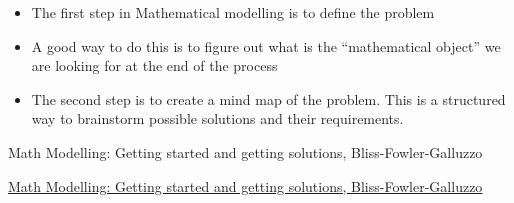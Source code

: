 \begin{lesson}

	\begin{itemize}
		\item The first step in Mathematical modelling is to define the problem
		\item A good way to do this is to figure out what is the ``mathematical object'' we are looking for at the end of the process

		\item The second step is to create a mind map of the problem. This is a structured way to brainstorm possible solutions and their requirements.
	\end{itemize}
	

\begin{annotation}
	\begin{goals}
	Math Modelling: Getting started and getting solutions, Bliss-Fowler-Galluzzo
	
	\hfill {}	
	\end{goals}
\end{annotation}
	 \href{https://m3challenge.siam.org/resources/modeling-handbook}{Math Modelling: Getting started and getting solutions, Bliss-Fowler-Galluzzo}

\end{lesson}







\def\email{
	\begin{graybox}
	-------- Forwarded Message -------- \\[10pt]
	\textbf{Date: } \dayofweekname{7}{9}{\the\year}, 7 September \the\year \; 21:41:35 + 0000  \\
	\textbf{From: } CEO <theCEO@theBigCompany.ca> \\
	\textbf{To: } Human Resources <hr@theBigCompany.ca> \\
	\textbf{Subject: } they're still late! \\
	
	Hey Shophika! \\
	
	I still get complaints about staff being late, some by 15 minutes.
	
	With the staff we have, that's about one salary lost.
	
	Again the bottleneck of the elevators seems to be the problem.
	
	Can you suggest solutions? \\
	
	Thanks, the CEO
	\end{graybox}
}


